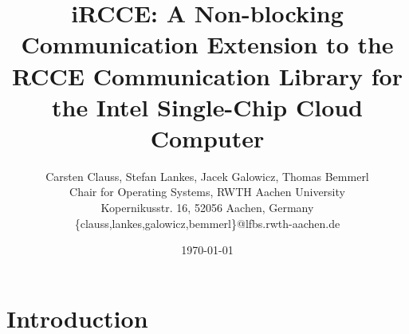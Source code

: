 \documentclass[fontsize=10pt, paper=a4, DIV12, pagesize=auto]{scrartcl}
\begin{document}
\title{iRCCE: A Non-blocking Communication Extension to the RCCE Communication Library for the Intel Single-Chip Cloud Computer}

\author{Carsten Clauss, Stefan Lankes, Jacek Galowicz, Thomas Bemmerl\\Chair for Operating Systems, RWTH Aachen University\\Kopernikusstr. 16, 52056 Aachen, Germany\\ \{clauss,lankes,galowicz,bemmerl\}@lfbs.rwth-aachen.de}

\date{\today}

\maketitle




\section{Introduction}\label{sec:introduction}
\end{document}
